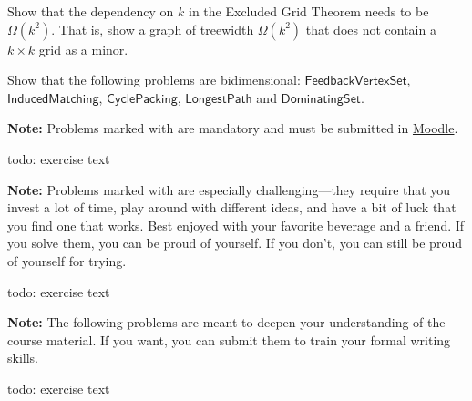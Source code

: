 \documentclass{uebung_cs}
\begin{document}
\begin{exercise}
Show that the dependency on $k$ in the Excluded Grid Theorem needs to be $\Omega(k^2)$. That is, show a graph of treewidth $\Omega(k^2)$ that does not contain a $k \times k$ grid as a minor.
\end{exercise}

\begin{exercise}
Show that the following problems are bidimensional: $\mathsf{FeedbackVertexSet}$, $\mathsf{InducedMatching}$, $\mathsf{CyclePacking}$, $\mathsf{LongestPath}$ and $\mathsf{DominatingSet}$.
\end{exercise}


\textbf{Note:} Problems marked with \mandatory are mandatory and must be submitted in \href{https://moodle.studiumdigitale.uni-frankfurt.de/moodle/course/view.php?id=6259}{Moodle}.

\begin{exercise}
  todo: exercise text
\end{exercise}

\textbf{Note:} Problems marked with \hard are especially challenging---they require that you invest a lot of time, play around with different ideas, and have a bit of luck that you find one that works. Best enjoyed with your favorite beverage and a friend. If you solve them, you can be proud of yourself. If you don't, you can still be proud of yourself for trying.

\begin{exercise}
  todo: exercise text
\end{exercise}

\newpage
\textbf{Note:} The following problems are meant to deepen your understanding of the course material. If you want, you can submit them to train your formal writing skills.

\begin{exercise}
  todo: exercise text
\end{exercise}
\end{document}
